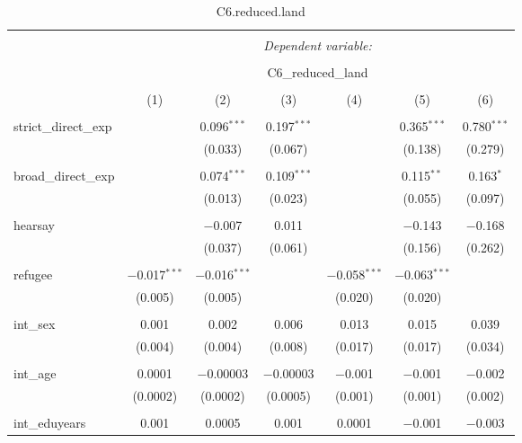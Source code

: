 
\begin{table}[H] \centering 
  \caption{C6.reduced.land} 
  \label{} 
\tiny 
\begin{tabular}{@{\extracolsep{4pt}}lcccccc} 
\\[-1.8ex]\hline 
\hline \\[-1.8ex] 
 & \multicolumn{6}{c}{\textit{Dependent variable:}} \\ 
\cline{2-7} 
\\[-1.8ex] & \multicolumn{6}{c}{C6\_reduced\_land} \\ 
\\[-1.8ex] & (1) & (2) & (3) & (4) & (5) & (6)\\ 
\hline \\[-1.8ex] 
 strict\_direct\_exp &  & 0.096$^{***}$ & 0.197$^{***}$ &  & 0.365$^{***}$ & 0.780$^{***}$ \\ 
  &  & (0.033) & (0.067) &  & (0.138) & (0.279) \\ 
  & & & & & & \\ 
 broad\_direct\_exp &  & 0.074$^{***}$ & 0.109$^{***}$ &  & 0.115$^{**}$ & 0.163$^{*}$ \\ 
  &  & (0.013) & (0.023) &  & (0.055) & (0.097) \\ 
  & & & & & & \\ 
 hearsay &  & $-$0.007 & 0.011 &  & $-$0.143 & $-$0.168 \\ 
  &  & (0.037) & (0.061) &  & (0.156) & (0.262) \\ 
  & & & & & & \\ 
 refugee & $-$0.017$^{***}$ & $-$0.016$^{***}$ &  & $-$0.058$^{***}$ & $-$0.063$^{***}$ &  \\ 
  & (0.005) & (0.005) &  & (0.020) & (0.020) &  \\ 
  & & & & & & \\ 
 int\_sex & 0.001 & 0.002 & 0.006 & 0.013 & 0.015 & 0.039 \\ 
  & (0.004) & (0.004) & (0.008) & (0.017) & (0.017) & (0.034) \\ 
  & & & & & & \\ 
 int\_age & 0.0001 & $-$0.00003 & $-$0.00003 & $-$0.001 & $-$0.001 & $-$0.002 \\ 
  & (0.0002) & (0.0002) & (0.0005) & (0.001) & (0.001) & (0.002) \\ 
  & & & & & & \\ 
 int\_eduyears & 0.001 & 0.0005 & 0.001 & 0.0001 & $-$0.001 & $-$0.003 \\ 

\end{tabular}
\end{table}
